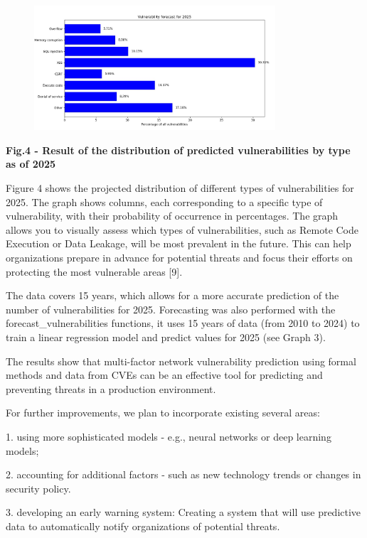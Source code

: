 \begin{figure}[H]
	\centering
	\includegraphics[width=0.8\textwidth]{media/ict2/image167}
	\caption*{}
\end{figure}


{\bfseries Fig.4 - Result of the distribution of predicted vulnerabilities
by type as of 2025}

Figure 4 shows the projected distribution of different types of
vulnerabilities for 2025. The graph shows columns, each corresponding to
a specific type of vulnerability, with their probability of occurrence
in percentages. The graph allows you to visually assess which types of
vulnerabilities, such as Remote Code Execution or Data Leakage, will be
most prevalent in the future. This can help organizations prepare in
advance for potential threats and focus their efforts on protecting the
most vulnerable areas {[}9{]}.

The data covers 15 years, which allows for a more accurate prediction of
the number of vulnerabilities for 2025. Forecasting was also performed
with the forecast\_vulnerabilities functions, it uses 15 years of data
(from 2010 to 2024) to train a linear regression model and predict
values for 2025 (see Graph 3).

The results show that multi-factor network vulnerability prediction
using formal methods and data from CVEs can be an effective tool for
predicting and preventing threats in a production environment.

For further improvements, we plan to incorporate existing several areas:

1. using more sophisticated models - e.g., neural networks or deep
learning models;

2. accounting for additional factors - such as new technology trends or
changes in security policy.

3. developing an early warning system: Creating a system that will use
predictive data to automatically notify organizations of potential
threats.


